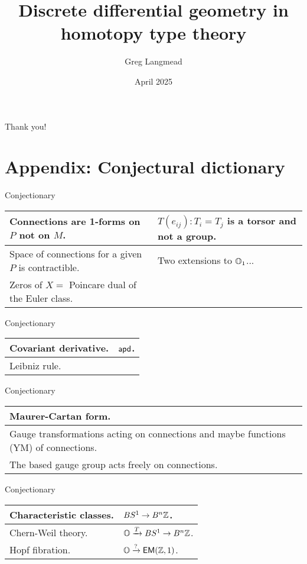 \documentclass[13pt,aspectratio=169,hyperref={hypertexnames = false},handout]{beamer}
\title[Geometry in HoTT]{Discrete differential geometry in homotopy type theory}
\author{Greg Langmead}
\institute[CMU]{Carnegie Mellon University}
\date{April 2025}
\begin{document}
\begin{frame}
\titlepage
\end{frame}

\newlength{\mylen}
\newlength{\mylin}









\begin{frame}
\begin{center}
\alert{\huge{Thank you!}}
\end{center}
\end{frame}

\section{Appendix: Conjectural dictionary}
\renewcommand{\arraystretch}{1.4}
\begin{frame}{Conjectionary}
\begin{tabular}{|p{17em}|p{17em}|}
\hline
Connections are 1-forms on \( P \) not on \( M \). & \( T(e_{ij}):T_i=T_j \) is a torsor and not a group. \\ \hline
Space of connections for a given \( P \) is contractible. & Two extensions to \( \mathbb{O}_1 \)...\\ \hline
Zeros of \( X = \) Poincare dual of the Euler class. & \\ \hline
\end{tabular}
\end{frame}

\begin{frame}{Conjectionary}
\begin{tabular}{|p{17em}|p{17em}|}
\hline
Covariant derivative. & \( \mathsf{apd} \).\\ \hline
Leibniz rule. & \\ \hline
\end{tabular}
\end{frame}

\begin{frame}{Conjectionary}
\begin{tabular}{|p{17em}|p{17em}|}
\hline
Maurer-Cartan form. & \\ \hline
Gauge transformations acting on connections and maybe functions (YM) of connections. & \\ \hline
The based gauge group acts freely on connections. & \\ \hline
\end{tabular}
\end{frame}

\begin{frame}{Conjectionary}
\begin{tabular}{|p{17em}|p{17em}|}
\hline
Characteristic classes. & \( BS^1\to B^n\mathbb{Z} \).\\ \hline
Chern-Weil theory. & \( \mathbb{O}\xrightarrow[]{T}BS^1\to B^n\mathbb{Z} \). \\ \hline
Hopf fibration. & \( \mathbb{O}\xrightarrow[]{?}\mathsf{EM}(\mathbb{Z},1) \).  \\ \hline
\end{tabular}
\end{frame}
\end{document}
